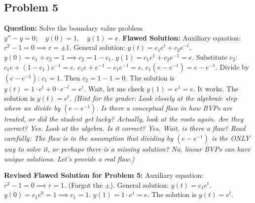 \documentclass[12pt]{article}
\begin{document}
\subsection{Problem 5}
\textbf{Question:} Solve the boundary value problem $y'' - y = 0; \quad y(0)=1, \quad y(1)=e$.
\textbf{Flawed Solution:}
Auxiliary equation: $r^2 - 1 = 0 \implies r = \pm 1$.
General solution: $y(t) = c_1 e^t + c_2 e^{-t}$.
$y(0) = c_1 + c_2 = 1 \implies c_2 = 1 - c_1$.
$y(1) = c_1 e^1 + c_2 e^{-1} = e$.
Substitute $c_2$: $c_1 e + (1 - c_1)e^{-1} = e$.
$c_1 e + e^{-1} - c_1 e^{-1} = e$.
$c_1(e - e^{-1}) = e - e^{-1}$.
Divide by $(e - e^{-1})$: $c_1 = 1$.
Then $c_2 = 1 - 1 = 0$.
The solution is $y(t) = 1 \cdot e^t + 0 \cdot e^{-t} = e^t$.
Wait, let me check $y(1) = e^1 = e$. It works. The solution is $y(t) = e^t$.
\textit{(Hint for the grader: Look closely at the algebraic step where we divide by $(e - e^{-1})$. Is there a conceptual flaw in how BVPs are treated, or did the student get lucky? Actually, look at the roots again. Are they correct? Yes. Look at the algebra. Is it correct? Yes. Wait, is there a flaw? Read carefully: The flaw is in the assumption that dividing by $(e - e^{-1})$ is the ONLY way to solve it, or perhaps there is a missing solution? No, linear BVPs can have unique solutions. Let's provide a real flaw.)}

\textbf{Revised Flawed Solution for Problem 5:}
Auxiliary equation: $r^2 - 1 = 0 \implies r = 1$. (Forgot the $\pm$).
General solution: $y(t) = c_1 e^t$.
$y(0) = c_1 e^0 = 1 \implies c_1 = 1$.
$y(1) = 1 \cdot e^1 = e$.
The solution is $y(t) = e^t$.
\end{document}
